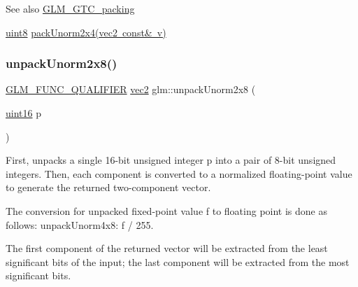 \begin{DoxySeeAlso}{See also}
\mbox{\hyperlink{group__gtc__packing}{G\+L\+M\+\_\+\+G\+T\+C\+\_\+packing}} 

\mbox{\hyperlink{group__gtc__type__precision_ga1a7dcd8aac97cc8020817c94049deff2}{uint8}} \mbox{\hyperlink{group__gtc__packing_gad68eb2f848ba867192b8787998c0595a}{pack\+Unorm2x4(vec2 const\& v)}} 
\end{DoxySeeAlso}
\mbox{\label{group__gtc__packing_ga96ce0c24339ee676e28a027fffd1edf6}} 
\subsubsection{\texorpdfstring{unpack\+Unorm2x8()}{unpackUnorm2x8()}}
{\footnotesize\ttfamily \mbox{\hyperlink{setup_8hpp_a33fdea6f91c5f834105f7415e2a64407}{G\+L\+M\+\_\+\+F\+U\+N\+C\+\_\+\+Q\+U\+A\+L\+I\+F\+I\+ER}} \mbox{\hyperlink{group__core__types_gaa1618f51db67eaa145db101d8c8431d8}{vec2}} glm\+::unpack\+Unorm2x8 (\begin{DoxyParamCaption}\item[{\mbox{\hyperlink{group__gtc__type__precision_gad8c2939e1fdd8e5828b31d95c52255d5}{uint16}}}]{p }\end{DoxyParamCaption})}

First, unpacks a single 16-\/bit unsigned integer p into a pair of 8-\/bit unsigned integers. Then, each component is converted to a normalized floating-\/point value to generate the returned two-\/component vector.

The conversion for unpacked fixed-\/point value f to floating point is done as follows\+: unpack\+Unorm4x8\+: f / 255.

The first component of the returned vector will be extracted from the least significant bits of the input; the last component will be extracted from the most significant bits.

